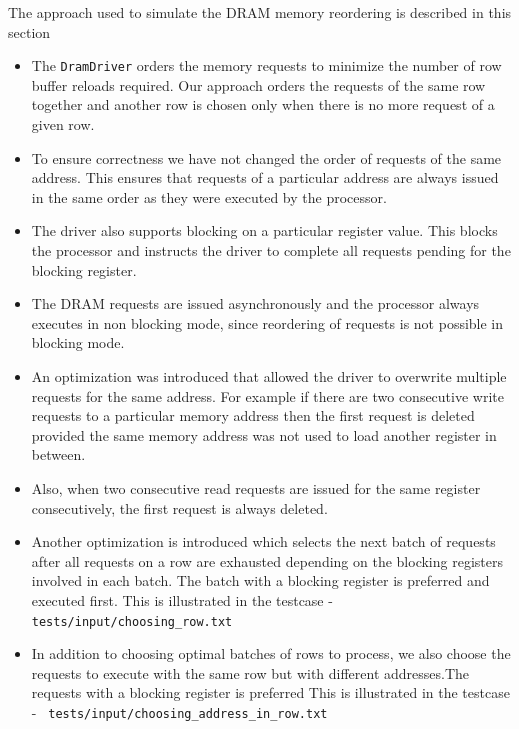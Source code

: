 \documentclass[hidelinks,12pt]{article}
\begin{document}
The approach used to simulate the DRAM memory reordering is described in this section
\begin{itemize}
    \item The \verb|DramDriver| orders the memory requests to minimize the number of row buffer reloads required. Our approach orders the requests of the same row together and another row is chosen only when there is no more request of a given row.
    \item To ensure correctness we have not changed the order of requests of the same address. This ensures that requests of a particular address are always issued in the same order as they were executed by the processor.
    \item The driver also supports blocking on a particular register value. This blocks the processor and instructs the driver to complete all requests pending for the blocking register.
    \item The DRAM requests are issued asynchronously and the processor always executes in non blocking mode, since reordering of requests is not possible in blocking mode.
    \item An optimization was introduced that allowed the driver to overwrite multiple requests for the same address. For example if there are two consecutive write requests to a particular memory address then the first request is deleted provided the same memory address was not used to load another register in between.
    \item Also, when two consecutive read requests are issued for the same register consecutively, the first request is always deleted.
    \item Another optimization is introduced which selects the next batch of requests after all requests on a row are exhausted depending on the blocking registers involved in each batch. The batch with a blocking register is preferred and executed first. This is illustrated in the testcase -\verb|tests/input/choosing_row.txt|
    \item In addition to choosing optimal batches of rows to process, we also choose the requests to execute with the same row but with different addresses.The requests with a blocking register is preferred This is illustrated in the testcase - \verb| tests/input/choosing_address_in_row.txt |
\end{itemize}
\end{document}
